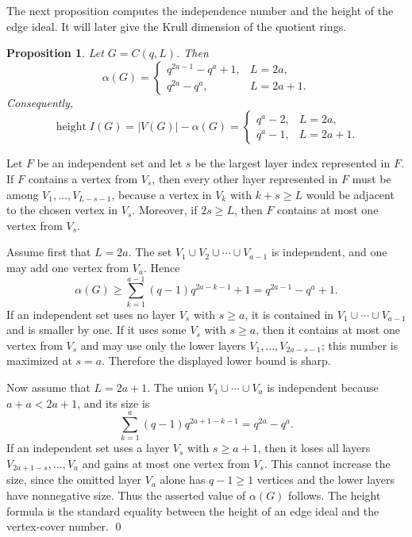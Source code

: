 \documentclass[12pt]{article}
\newtheorem{proposition}[theorem]{Proposition}
\theoremstyle{definition}
\renewenvironment{proof}{{\bf \noindent Proof.}}{\qed}
\begin{document}
\medskip

The next proposition computes the independence number and the height of the edge ideal.  It will later give the Krull dimension of the quotient rings.

\medskip

\begin{proposition}\label{prop:chain-alpha}
	Let $G=C(q,L)$.  Then
	$$
	\alpha(G)=
	\begin{cases}
		q^{2a-1}-q^a+1, & L=2a,\\[2pt]
		q^{2a}-q^a, & L=2a+1.
	\end{cases}
	$$
	Consequently,
	$$
	\operatorname{height} I(G)=|V(G)|-\alpha(G)=
	\begin{cases}
		q^a-2, & L=2a,\\[2pt]
		q^a-1, & L=2a+1.
	\end{cases}
	$$
\end{proposition}

\begin{proof}
	Let $F$ be an independent set and let $s$ be the largest layer index represented in $F$.  If $F$ contains a vertex from $V_s$, then every other layer represented in $F$ must be among $V_1,\ldots,V_{L-s-1}$, because a vertex in $V_k$ with $k+s\geq L$ would be adjacent to the chosen vertex in $V_s$.  Moreover, if $2s\geq L$, then $F$ contains at most one vertex from $V_s$.
	
	\medskip
	
	Assume first that $L=2a$.  The set
	$ V_1\cup V_2\cup\cdots\cup V_{a-1} $ 	is independent, and one may add one vertex from $V_a$.  Hence
	$$
	\alpha(G)\geq \sum_{k=1}^{a-1}(q-1)q^{2a-k-1}+1=q^{2a-1}-q^a+1.
	$$
	If an independent set uses no layer $V_s$ with $s\geq a$, it is contained in $V_1\cup\cdots\cup V_{a-1}$ and is smaller by one.  If it uses some $V_s$ with $s\geq a$, then it contains at most one vertex from $V_s$ and may use only the lower layers $V_1,\ldots,V_{2a-s-1}$; this number is maximized at $s=a$.  Therefore the displayed lower bound is sharp.
	
	\medskip
	
	Now assume that $L=2a+1$.  The union $V_1\cup\cdots\cup V_a$ is independent because $a+a<2a+1$, and its size is
	$$
	\sum_{k=1}^{a}(q-1)q^{2a+1-k-1}=q^{2a}-q^a.
	$$
	If an independent set uses a layer $V_s$ with $s\geq a+1$, then it loses all layers $V_{2a+1-s},\ldots,V_a$ and gains at most one vertex from $V_s$.  This cannot increase the size, since the omitted layer $V_a$ alone has $q-1\geq 1$ vertices and the lower layers have nonnegative size.  Thus the asserted value of $\alpha(G)$ follows.  The height formula is the standard equality between the height of an edge ideal and the vertex-cover number.
\end{proof}
\end{document}
